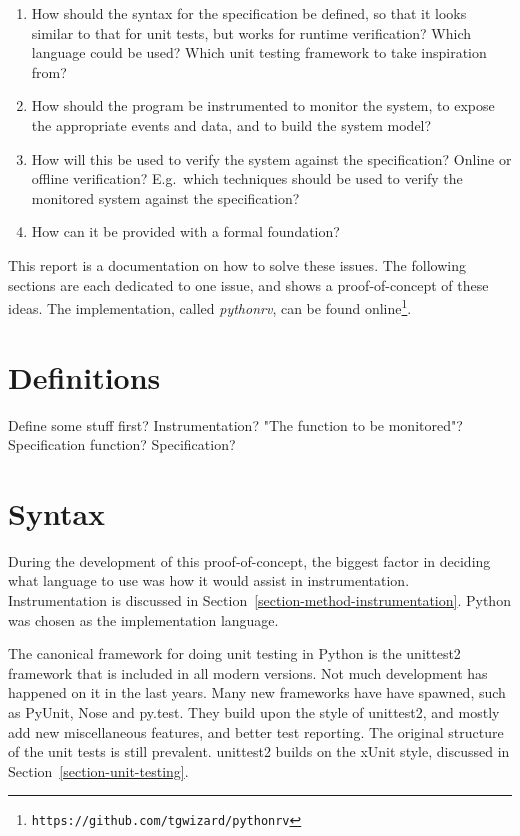 \documentclass[a4paper,11pt]{kth-mag}
\begin{document}
\begin{enumerate}
	\item How should the syntax for the specification be defined, so that it
		looks similar to that for unit tests, but works for runtime verification?
		Which language could be used? Which unit testing framework to take
		inspiration from?
	\item How should the program be instrumented to monitor the system, to expose
		the appropriate events and data, and to build the system model?
	\item How will this be used to verify the system against the
		specification? Online or offline verification? E.g.\ which techniques
		should be used to verify the monitored system against the specification?
	\item How can it be provided with a formal foundation?
\end{enumerate}

This report is a documentation on how to solve these issues. The following
sections are each dedicated to one issue, and shows a proof-of-concept of these
ideas. The implementation, called \textit{pythonrv}, can be found
online\footnote{\texttt{https://github.com/tgwizard/pythonrv}}.

\section{Definitions}

Define some stuff first? Instrumentation? "The function to be monitored"?
Specification function? Specification?

\section{Syntax}

During the development of this proof-of-concept, the biggest factor in deciding
what language to use was how it would assist in instrumentation.
Instrumentation is discussed in Section~\ref{section-method-instrumentation}.
Python was chosen as the implementation language.

The canonical framework for doing unit testing in Python is the unittest2
framework that is included in all modern versions. Not much development has
happened on it in the last years. Many new frameworks have have spawned, such
as PyUnit, Nose and py.test. They build upon the style of unittest2, and mostly
add new miscellaneous features, and better test reporting. The original
structure of the unit tests is still prevalent. unittest2 builds on the xUnit
style, discussed in Section~\ref{section-unit-testing}.
\end{document}

